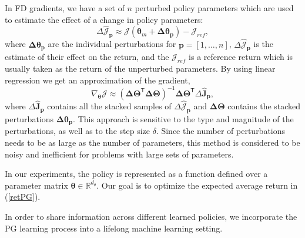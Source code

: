 \documentclass{aamas2016}
\renewcommand{\Re}{\mathbb{R}}
\newcommand{\transpose}{\text{$\mathsf{T}$}}
\begin{document}
In FD gradients, we have a set of $n$ perturbed policy parameters which are used to estimate the effect of a change in policy parameters:
\begin{displaymath}
 \Delta\hat{\mathcal{J}}_{\mathbf{p}} \approx \mathcal{J}(\boldsymbol{\theta}_{m}+\boldsymbol{\Delta\theta_{p}}) - \mathcal{J}_{ref},
\end{displaymath}
where $\boldsymbol{\Delta\theta_{p}}$ are the individual perturbations for $\mathbf{p}=[1,\ldots,n]$, $\Delta\hat{\mathcal{J}}_{\mathbf{p}}$ is the estimate of their 
effect on the return, and the $\mathcal{J}_{ref}$ is a reference return which is usually taken as the return of the unperturbed
parameters. By using linear regression we get an approximation of the gradient,
\begin{displaymath}
 \nabla_{\boldsymbol{\theta}}\mathcal{J} \approx \left(\boldsymbol{\Delta\Theta^{\transpose}\Delta\Theta}\right)^{-1}\boldsymbol{\Delta\Theta}^{\transpose}\Delta\boldsymbol{\hat{J}_{p}},
\end{displaymath}
where $\Delta\boldsymbol{\hat{J}_{p}}$ contains all the stacked samples of $\Delta\hat{\mathcal{J}}_{\mathbf{p}}$ and  $\boldsymbol{\Delta\Theta}$
contains the stacked perturbations $\boldsymbol{\Delta\theta_{p}}$. This approach is sensitive to the type and magnitude of the perturbations, as well as
to the step size $\delta$. Since the number of perturbations needs to be as large as the number of parameters, this method is
considered to be noisy and inefficient for problems with large sets of parameters.%

In our experiments, the policy is represented as a function defined over a parameter matrix 
$\boldsymbol{\theta} \in \Re^{d_{\theta}}$. 
Our goal is to optimize the expected average return in (\ref{retPG}).


In order to share information across different learned policies, we incorporate the PG learning process into a lifelong machine learning 
setting.

\end{document}
